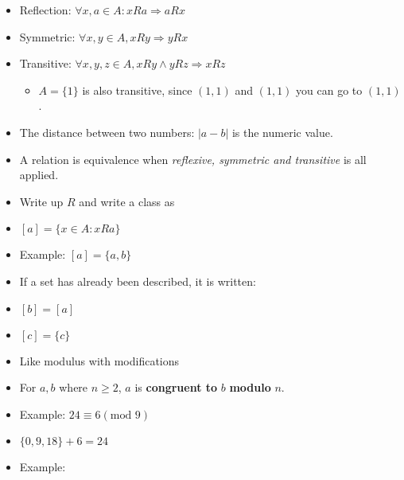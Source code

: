 \documentclass[english,10pt,a4paper]{article}
\begin{document}
\begin{theo}[Reflection] 
\begin{itemize}
\item Reflection: $\forall x, a \in A: xRa \Rightarrow aRx$
\end{itemize}
\end{theo}

\begin{theo}[Symmetric] 
\begin{itemize}
\item Symmetric: $\forall x, y \in A, xRy \Rightarrow yRx$
\end{itemize}
\end{theo}

\begin{theo}[Transitive] 
\begin{itemize}
\item Transitive: $\forall x,y,z \in A, xRy \wedge yRz \Rightarrow xRz$
\begin{itemize}
\item $A=\{1\}$ is also transitive, since $(1,1)$ and $(1,1)$ you can go to $(1,1)$.
\end{itemize}
\end{itemize}
\end{theo}

\begin{theo}[Distance] 
\begin{itemize}
\item The distance between two numbers: $|a-b|$ is the numeric value.
\end{itemize}
\end{theo}

\begin{theo} 
\begin{itemize}
\item A relation is equivalence when \textit{reflexive, symmetric and transitive} is all applied.
\item Write up $R$ and write a class as
\item[] $[a]=\{x \in A: x R a\}$
\item[] Example:  $[a]=\{a,b\}$
\item If a set has already been described, it is written:
\item[] $[b] = [a]$
\item[] $[c] = \{c\}$
\end{itemize}
\end{theo}

\begin{theo} 
\begin{itemize}
\item Like modulus with modifications
\item For $a,b$ where $n \geq 2$, $a$ is \textbf{congruent to} $b$ \textbf{modulo} $n$.
\item[] Example: $24 \equiv 6 (\text{mod 9})$
\item[] $\{0, 9, 18\} + 6 = 24$
\item[] Example: 
\end{itemize}
\end{theo}
\end{document}
